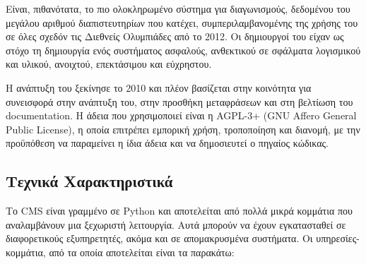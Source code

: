 \documentclass[diploma]{softlab-thesis}
\begin{document}
\bigskip

Είναι, πιθανότατα, το πιο ολοκληρωμένο σύστημα για διαγωνισμούς, δεδομένου του
μεγάλου αριθμού διαπιστευτηρίων που κατέχει, συμπεριλαμβανομένης της χρήσης του
σε όλες σχεδόν τις Διεθνείς Ολυμπιάδες από το 2012. Οι δημιουργοί του είχαν ως
στόχο τη δημιουργία ενός συστήματος ασφαλούς, ανθεκτικού σε σφάλματα λογισμικού
και υλικού, ανοιχτού, επεκτάσιμου και εύχρηστου.

\bigskip

Η ανάπτυξη του ξεκίνησε το 2010 και πλέον βασίζεται στην κοινότητα για
συνεισφορά στην ανάπτυξη του, στην προσθήκη μεταφράσεων και στη βελτίωση του
documentation. H άδεια που χρησιμοποιεί είναι η AGPL-3+ (GNU Affero General
Public License), η οποία επιτρέπει εμπορική χρήση, τροποποίηση και διανομή, με
την προϋπόθεση να παραμείνει η ίδια άδεια και να δημοσιευτεί ο πηγαίος κώδικας.

\subsection{Τεχνικά Χαρακτηριστικά}

Το CMS είναι γραμμένο σε Python και αποτελείται από πολλά μικρά κομμάτια που
αναλαμβάνουν μια ξεχωριστή λειτουργία. Αυτά μπορούν να έχουν εγκατασταθεί σε
διαφορετικούς εξυπηρετητές, ακόμα και σε απομακρυσμένα συστήματα. Οι
υπηρεσίες-κομμάτια, από τα οποία αποτελείται είναι τα παρακάτω:
\end{document}
